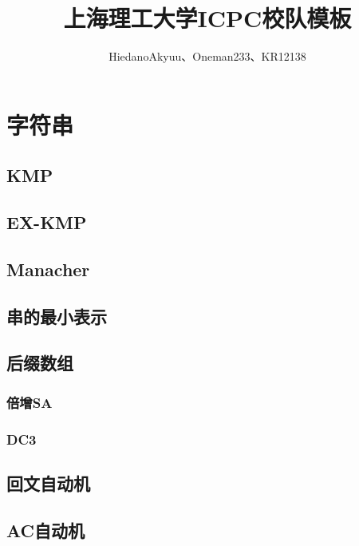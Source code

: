 \documentclass[twocolumn,a4]{article}
\title{\CJKfamily{hei} \bfseries 上海理工大学ICPC校队模板}
\author{HiedanoAkyuu、Oneman233、KR12138}
\newcommand{\addcpp}[1]{}
\begin{document}
\small
\begin{titlepage}
\maketitle
\end{titlepage}

\newpage
\pagestyle{empty}
\renewcommand{\contentsname}{目录}
\tableofcontents
\newpage\clearpage
\newpage
\pagestyle{fancy}
\setcounter{page}{1}   %

\section{字符串}
	\subsection{KMP}
	\subsection{EX-KMP}
		\addcpp{string/EX-KMP}
	\subsection{Manacher}
	\subsection{串的最小表示}
	\subsection{后缀数组}
		\subsubsection{倍增SA}
		\subsubsection{DC3}
	\subsection{回文自动机}
	\subsection{AC自动机	}
\end{document}
